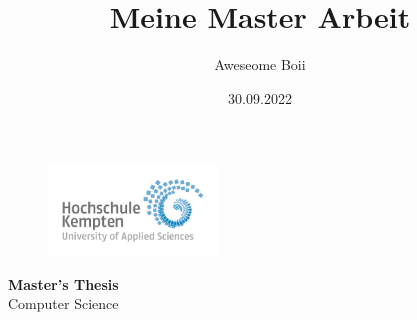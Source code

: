 \documentclass[
  12pt,
  a4paper,
  oneside]{book}
\title{Meine Master Arbeit}
\author{Aweseome Boii}
\date{30.09.2022}
\begin{document}
\frontmatter
\maketitle

\thispagestyle{empty}

\begin{figure}[t]
 \raggedleft
 \includegraphics[width=0.4\textwidth]{imgs/logo.jpg}
\end{figure}






\onehalfspacing
\begin{center}
    \textbf{\large{Master's Thesis}}\\
    \large{Computer Science}\\
    \vspace{50pt}

    \textbf{\LARGE{\thetitle}}\\
    \vspace{50pt}

    \large{\theauthor}\\
    \vspace{150pt}
\end{center}
\end{document}
